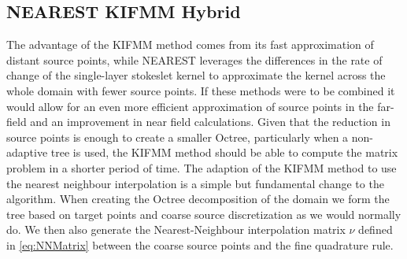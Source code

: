 \FloatBarrier

\subsection{NEAREST KIFMM Hybrid} \label{sec:Hybrid}
The advantage of the KIFMM method comes from its fast approximation of distant source points, while NEAREST leverages the differences in the rate of change of the single-layer stokeslet kernel to approximate the kernel across the whole domain with fewer source points. If these methods were to be combined it would allow for an even more efficient approximation of source points in the far-field and an improvement in near field calculations. Given that the reduction in source points is enough to create a smaller Octree, particularly when a non-adaptive tree is used, the KIFMM method should be able to compute the matrix problem in a shorter period of time. The adaption of the KIFMM method to use the nearest neighbour interpolation is a simple but fundamental change to the algorithm. When creating the Octree decomposition of the domain we form the tree based on target points and coarse source discretization as we would normally do. We then also generate the Nearest-Neighbour interpolation matrix $\nu$ defined in \cref{eq:NNMatrix} between the coarse source points and the fine quadrature rule.  

